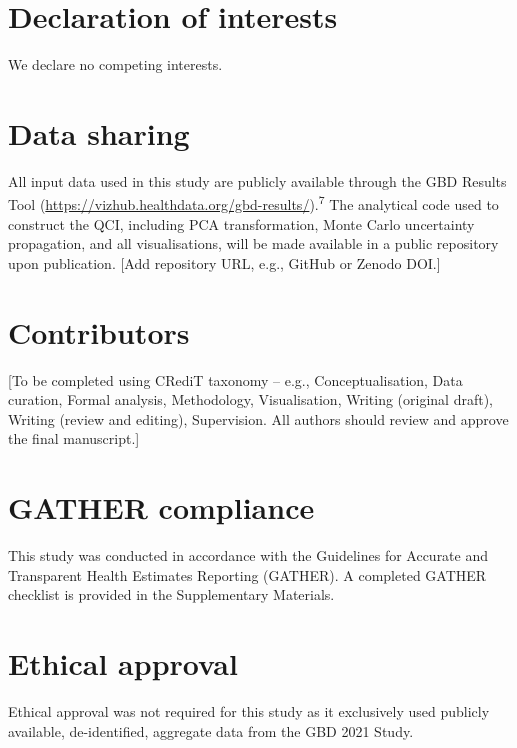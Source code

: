 \documentclass[12pt]{article}
\begin{document}
\clearpage

\section*{Declaration of interests}

We declare no competing interests.

\section*{Data sharing}

All input data used in this study are publicly available through the GBD Results Tool (\url{https://vizhub.healthdata.org/gbd-results/}).\textsuperscript{7} The analytical code used to construct the QCI, including PCA transformation, Monte Carlo uncertainty propagation, and all visualisations, will be made available in a public repository upon publication. [Add repository URL, e.g., GitHub or Zenodo DOI.]

\section*{Contributors}

[To be completed using CRediT taxonomy -- e.g., Conceptualisation, Data curation, Formal analysis, Methodology, Visualisation, Writing (original draft), Writing (review and editing), Supervision. All authors should review and approve the final manuscript.]

\section*{GATHER compliance}

This study was conducted in accordance with the Guidelines for Accurate and Transparent Health Estimates Reporting (GATHER). A completed GATHER checklist is provided in the Supplementary Materials.

\section*{Ethical approval}

Ethical approval was not required for this study as it exclusively used publicly available, de-identified, aggregate data from the GBD 2021 Study.
\end{document}
